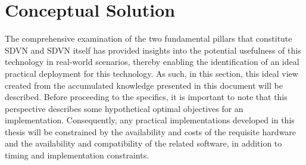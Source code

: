 \chapter{Conceptual Solution}
\label{cha:conceptual_solution}

    The comprehensive examination of the two fundamental pillars that constitute SDVN and SDVN itself has provided insights into the potential usefulness of this technology in real-world scenarios, thereby enabling the identification of an ideal practical deployment for this technology. As such, in this section, this ideal view created from the accumulated knowledge presented in this document will be described.
    Before proceeding to the specifics, it is important to note that this perspective describes some hypothetical optimal objectives for an implementation. Consequently, any practical implementations developed in this thesis will be constrained by the availability and costs of the requisite hardware and the availability and compatibility of the related software, in addition to timing and implementation constraints.    
    
